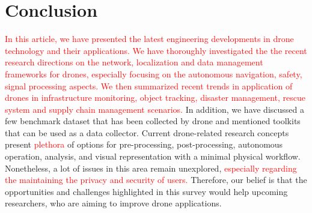 \section{Conclusion}
\label{conclusionsection}
\textcolor{red}{
In this article, we have presented the latest engineering developments in drone technology and their applications. We have thoroughly investigated the the recent research directions on the network, localization and data management frameworks for drones, especially focusing on the autonomous navigation, safety, signal processing aspects. We then summarized recent trends in application of drones in infrastructure monitoring, object tracking, disaster management, rescue system and supply chain management scenarios. 
}
In addition, we have discussed a few benchmark dataset that has been collected by drone and mentioned toolkits that can be used as a data collector. 
Current drone-related research concepts present \textcolor{red}{plethora} of options for pre-processing, post-processing, autonomous operation, analysis, and visual representation with a minimal physical workflow. 
Nonetheless, a lot of issues in this area remain unexplored, 
\textcolor{red}{especially regarding the maintaining the privacy and security of users.}
  Therefore, our belief is that the opportunities and challenges highlighted in this survey would help upcoming researchers, who are aiming to improve drone applications.